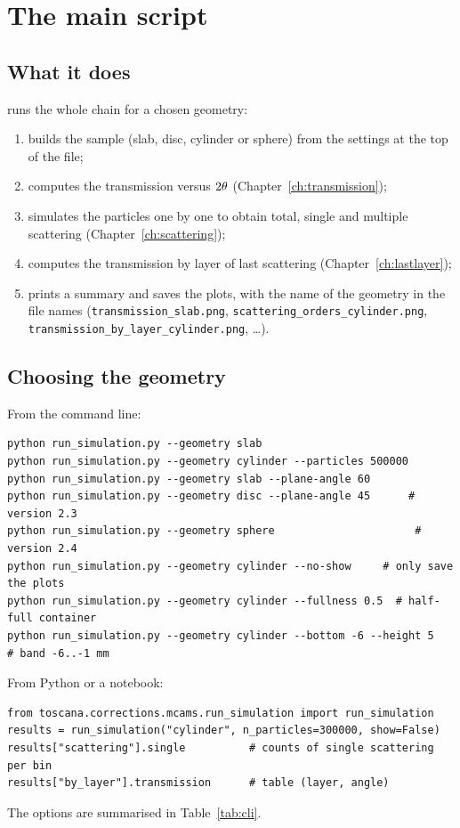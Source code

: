 \chapter{The main script}
\label{ch:main}

\section{What it does}

 runs the whole chain for a chosen geometry:
\begin{enumerate}
  \item builds the sample (slab, disc, cylinder or sphere) from the settings at the top of the file;
  \item computes the transmission versus $2\theta$ (Chapter~\ref{ch:transmission});
  \item simulates the particles one by one to obtain total, single and multiple scattering (Chapter~\ref{ch:scattering});
  \item computes the transmission by layer of last scattering (Chapter~\ref{ch:lastlayer});
  \item \raggedright prints a summary and saves the plots, with the name of the geometry in the file names
        (\texttt{transmission\_slab.png}, \texttt{scattering\_orders\_cylinder.png}, \texttt{transmission\_by\_layer\_cylinder.png}, \ldots).
\end{enumerate}

\section{Choosing the geometry}

From the command line:
\begin{lstlisting}[style=shell]
python run_simulation.py --geometry slab
python run_simulation.py --geometry cylinder --particles 500000
python run_simulation.py --geometry slab --plane-angle 60
python run_simulation.py --geometry disc --plane-angle 45      # version 2.3
python run_simulation.py --geometry sphere                      # version 2.4
python run_simulation.py --geometry cylinder --no-show     # only save the plots
python run_simulation.py --geometry cylinder --fullness 0.5  # half-full container
python run_simulation.py --geometry cylinder --bottom -6 --height 5   # band -6..-1 mm
\end{lstlisting}
From Python or a notebook:
\begin{lstlisting}
from toscana.corrections.mcams.run_simulation import run_simulation
results = run_simulation("cylinder", n_particles=300000, show=False)
results["scattering"].single          # counts of single scattering per bin
results["by_layer"].transmission      # table (layer, angle)
\end{lstlisting}
The options are summarised in Table~\ref{tab:cli}.

